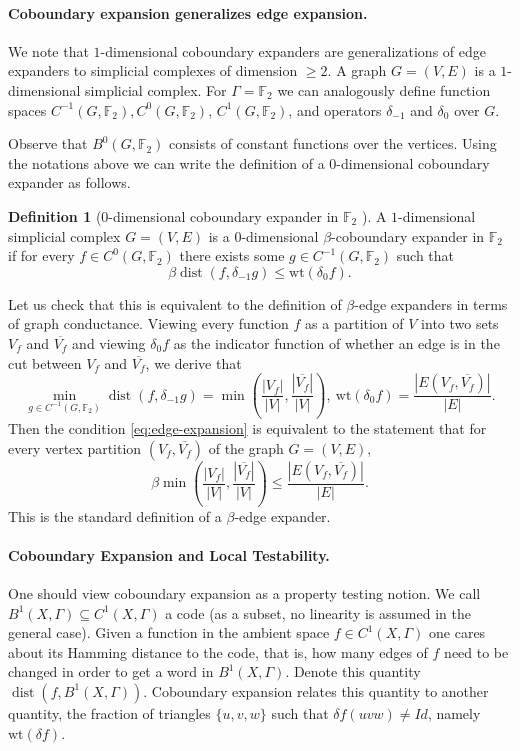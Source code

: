 \documentclass[10pt,a4paper]{article}
\newcommand{\prettyref}[1]{\cref{#1}}
\theoremstyle{definition}
\newtheorem{definition}[theorem]{Definition}
\theoremstyle{remark}
\newcommand{\set}[1]{\{#1\}}
\newcommand{\F}{\mathbb{F}}
\def\wt{{\mathrm{wt}}}
\DeclareMathOperator{\dist}{dist}
\renewcommand{\leq}{\leqslant}
\renewcommand{\ge}{\geqslant}
\numberwithin{equation}{section}
\let\origparagraph\paragraph
\renewcommand{\paragraph}[1]{\origparagraph{#1.}}
\let\pref=\prettyref
\newcommand{\coboundary}{{\delta}}
\begin{document}
\paragraph{Coboundary expansion generalizes edge expansion} We note that $1$-dimensional coboundary expanders are generalizations of edge expanders to simplicial complexes of dimension $\ge 2$. A graph $G = (V,E)$ is a $1$-dimensional simplicial complex. For $\Gamma = \F_2$ we can analogously define function spaces $C^{-1}(G,\F_2), C^{0}(G,\F_2)$, $C^{1}(G,\F_2)$, and operators $\coboundary_{-1}$ and $\coboundary_{0}$ over $G$. 

Observe that $B^0(G,\F_2)$ consists of constant functions over the vertices. 
Using the notations above we can write the definition of a $0$-dimensional coboundary expander as follows. 
    \begin{definition}[$0$-dimensional coboundary expander in $\F_2$ ]
        A $1$-dimensional simplicial complex $G=(V,E)$ is a $0$-dimensional $\beta$-coboundary expander in $\F_2$ if for every $f \in C^0(G,\F_2)$ there exists some $g \in C^{-1}(G,\F_2)$ such that 
\begin{equation}\label{eq:edge-expansion}
        \beta \dist(f,\coboundary_{-1} g) \leq \wt(\coboundary_0 f).
    \end{equation}
    
    \end{definition}
    Let us check that this is equivalent to the definition of $\beta$-edge expanders in terms of graph conductance. 
    Viewing every function $f$
    as a partition of $V$ into two sets $V_f$ and $\overline{V_f}$ and viewing $\coboundary_0 f$ as the indicator function of whether an edge is in the cut between $V_f$ and $\overline{V_f}$, we derive that 
    \[ \min_{g\in C^{-1}(G,\F_2)}\dist(f,\coboundary_{-1} g) =  \min\left(\frac{|V_f|}{|V|},\frac{|\overline{V_f}|}{|V|}\right), ~\wt(\coboundary_0 f) = \frac{|E(V_f,\overline{V_f})|}{|E|}.\]
    Then the condition \pref{eq:edge-expansion} is equivalent to the statement that for every vertex partition $(V_f,\overline{V_f})$ of the graph $G=(V,E)$,    
    \[\beta \min\left(\frac{|V_f|}{|V|},\frac{|\overline{V_f}|}{|V|}\right) \leq \frac{|E(V_f,\overline{V_f})|}{|E|}.\]
    This is the standard definition of a $\beta$-edge expander.


\paragraph{Coboundary Expansion and Local Testability}One should view coboundary expansion as a property testing notion. We call \(B^1(X,\Gamma) \subseteq C^1(X,\Gamma)\) a code (as a subset, no linearity is assumed in the general case). Given a function in the ambient space \(f \in C^1(X,\Gamma)\) one cares about its Hamming distance to the code, that is, how many edges of \(f\) need to be changed in order to get a word in \(B^1(X,\Gamma)\). Denote this quantity \(\dist(f,B^1(X,\Gamma))\). Coboundary expansion relates this quantity to another quantity, the fraction of triangles \(\set{u,v,w}\) such that \(\coboundary f(uvw) \ne Id\), namely \(\wt(\coboundary f)\).
\end{document}
